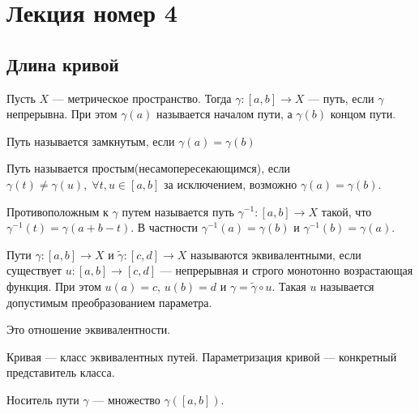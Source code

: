 \section{Лекция номер 4}

\subsection{Длина кривой}
%
\begin{conj}
  Пусть $X$ --- метрическое пространство. Тогда
  $\gamma\colon [a, b] \to X$ --- путь, если $\gamma$ непрерывна. При этом $\gamma(a)$ называется началом пути, а $\gamma(b)$ концом пути.
\end{conj}

\begin{conj}
  Путь называется замкнутым, если $\gamma(a) = \gamma(b)$
\end{conj}

\begin{conj}
  Путь называется простым(несамопересекающимся), если  $\gamma(t) \neq \gamma(u),\; \forall t, u \in [a, b]$ за исключением, возможно $\gamma(a) = \gamma(b)$.
\end{conj}

\begin{conj}
  Противоположным к $\gamma$ путем называется путь $\gamma^{-1}\colon [a, b] \to X$ такой, что $\gamma^{-1}(t) = \gamma(a + b - t)$. В частности $\gamma^{-1}(a) = \gamma(b)$ и $\gamma^{-1}(b) = \gamma(a)$.
\end{conj}

\begin{conj}
  Пути $\gamma\colon[a, b] \to X$ и $\widetilde{\gamma}\colon[c, d] \to X$ называются эквивалентными, если существует $u\colon [a, b] \to [c, d]$ --- непрерывная и строго монотонно возрастающая функция. При этом $u(a) = c,\, u(b) = d$ и $\gamma = \widetilde{\gamma} \circ u$.
  Такая $u$ называется допустимым преобразованием параметра.
\end{conj}

\begin{notice}
  Это отношение эквивалентности.
\end{notice}

\begin{conj}
  Кривая --- класс эквивалентных путей. Параметризация кривой --- конкретный представитель класса.
\end{conj}

\begin{conj}
  Носитель пути $\gamma$ --- множество $\gamma([a, b])$.
\end{conj}

